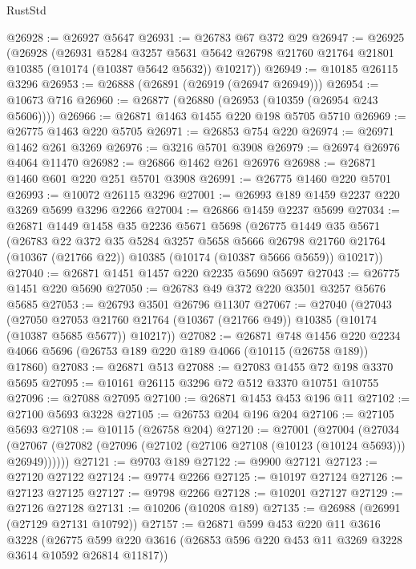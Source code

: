 \begin{lexlean}{RustStd}
\begin{coremodule}
@26928 := @26927 @5647
@26931 := @26783 @67 @372 @29
@26947 := @26925
    (@26928
      (@26931
        @5284
        @3257
        @5631
        @5642
        @26798
        @21760
        @21764
        @21801
        @10385
        (@10174 (@10387 @5642 @5632))
        @10217))
@26949 := @10185 @26115 @3296
@26953 := @26888 (@26891 (@26919 (@26947 @26949)))
@26954 := @10673 @716
@26960 := @26877 (@26880 (@26953 (@10359 (@26954 @243 @5606))))
@26966 := @26871 @1463 @1455 @220 @198 @5705 @5710
@26969 := @26775 @1463 @220 @5705
@26971 := @26853 @754 @220
@26974 := @26971 @1462 @261 @3269
@26976 := @3216 @5701 @3908
@26979 := @26974 @26976 @4064 @11470
@26982 := @26866 @1462 @261 @26976
@26988 := @26871 @1460 @601 @220 @251 @5701 @3908
@26991 := @26775 @1460 @220 @5701
@26993 := @10072 @26115 @3296
@27001 := @26993 @189 @1459 @2237 @220 @3269 @5699 @3296 @2266
@27004 := @26866 @1459 @2237 @5699
@27034 := @26871
    @1449
    @1458
    @35
    @2236
    @5671
    @5698
    (@26775
      @1449
      @35
      @5671
      (@26783
        @22
        @372
        @35
        @5284
        @3257
        @5658
        @5666
        @26798
        @21760
        @21764
        (@10367 (@21766 @22))
        @10385
        (@10174 (@10387 @5666 @5659))
        @10217))
@27040 := @26871 @1451 @1457 @220 @2235 @5690 @5697
@27043 := @26775 @1451 @220 @5690
@27050 := @26783 @49 @372 @220 @3501 @3257 @5676 @5685
@27053 := @26793 @3501 @26796 @11307
@27067 := @27040
    (@27043
      (@27050
        @27053
        @21760
        @21764
        (@10367 (@21766 @49))
        @10385
        (@10174 (@10387 @5685 @5677))
        @10217))
@27082 := @26871
    @748
    @1456
    @220
    @2234
    @4066
    @5696
    (@26753 @189 @220 @189 @4066 (@10115 (@26758 @189)) @17860)
@27083 := @26871 @513
@27088 := @27083 @1455 @72 @198 @3370 @5695
@27095 := @10161 @26115 @3296 @72 @512 @3370 @10751 @10755
@27096 := @27088 @27095
@27100 := @26871 @1453 @453 @196 @11
@27102 := @27100 @5693 @3228
@27105 := @26753 @204 @196 @204
@27106 := @27105 @5693
@27108 := @10115 (@26758 @204)
@27120 := @27001
    (@27004
      (@27034 (@27067 (@27082 (@27096 (@27102 (@27106 @27108 (@10123 (@10124 @5693))) @26949))))))
@27121 := @9703 @189
@27122 := @9900 @27121
@27123 := @27120 @27122
@27124 := @9774 @2266
@27125 := @10197 @27124
@27126 := @27123 @27125
@27127 := @9798 @2266
@27128 := @10201 @27127
@27129 := @27126 @27128
@27131 := @10206 (@10208 @189)
@27135 := @26988 (@26991 (@27129 @27131 @10792))
@27157 := @26871
    @599
    @453
    @220
    @11
    @3616
    @3228
    (@26775 @599 @220 @3616 (@26853 @596 @220 @453 @11 @3269 @3228 @3614 @10592 @26814 @11817))

\end{coremodule}
\end{lexlean}
